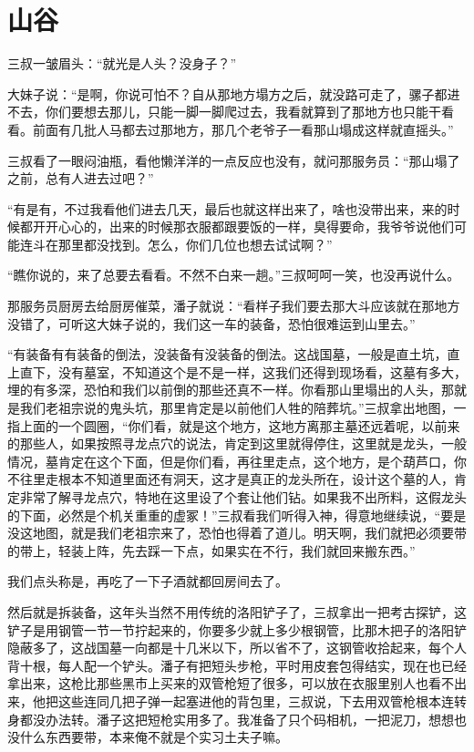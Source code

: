 \chapter{山谷}

三叔一皱眉头：“就光是人头？没身子？”

大妹子说：“是啊，你说可怕不？自从那地方塌方之后，就没路可走了，骡子都进不去，你们要想去那儿，只能一脚一脚爬过去，我看就算到了那地方也只能干看看。前面有几批人马都去过那地方，那几个老爷子一看那山塌成这样就直摇头。”

三叔看了一眼闷油瓶，看他懒洋洋的一点反应也没有，就问那服务员：“那山塌了之前，总有人进去过吧？”

“有是有，不过我看他们进去几天，最后也就这样出来了，啥也没带出来，来的时候都开开心心的，出来的时候那衣服都跟要饭的一样，臭得要命，我爷爷说他们可能连斗在那里都没找到。怎么，你们几位也想去试试啊？”

“瞧你说的，来了总要去看看。不然不白来一趟。”三叔呵呵一笑，也没再说什么。

那服务员厨房去给厨房催菜，潘子就说：“看样子我们要去那大斗应该就在那地方没错了，可听这大妹子说的，我们这一车的装备，恐怕很难运到山里去。”

“有装备有有装备的倒法，没装备有没装备的倒法。这战国墓，一般是直土坑，直上直下，没有墓室，不知道这个是不是一样，这我们还得到现场看，这墓有多大，埋的有多深，恐怕和我们以前倒的那些还真不一样。你看那山里塌出的人头，那就是我们老祖宗说的鬼头坑，那里肯定是以前他们人牲的陪葬坑。”三叔拿出地图，一指上面的一个圆圈，“你们看，就是这个地方，这地方离那主墓还远着呢，以前来的那些人，如果按照寻龙点穴的说法，肯定到这里就得停住，这里就是龙头，一般情况，墓肯定在这个下面，但是你们看，再往里走点，这个地方，是个葫芦口，你不往里走根本不知道里面还有洞天，这才是真正的龙头所在，设计这个墓的人，肯定非常了解寻龙点穴，特地在这里设了个套让他们钻。如果我不出所料，这假龙头的下面，必然是个机关重重的虚冢！”三叔看我们听得入神，得意地继续说，“要是没这地图，就是我们老祖宗来了，恐怕也得着了道儿。明天啊，我们就把必须要带的带上，轻装上阵，先去踩一下点，如果实在不行，我们就回来搬东西。”

我们点头称是，再吃了一下子酒就都回房间去了。

然后就是拆装备，这年头当然不用传统的洛阳铲子了，三叔拿出一把考古探铲，这铲子是用钢管一节一节拧起来的，你要多少就上多少根钢管，比那木把子的洛阳铲隐蔽多了，这战国墓一向都是十几米以下，所以省不了，这钢管收拾起来，每个人背十根，每人配一个铲头。潘子有把短头步枪，平时用皮套包得结实，现在也已经拿出来，这枪比那些黑市上买来的双管枪短了很多，可以放在衣服里别人也看不出来，他把这些连同几把子弹一起塞进他的背包里，三叔说，下去用双管枪根本连转身都没办法转。潘子这把短枪实用多了。我准备了只个码相机，一把泥刀，想想也没什么东西要带，本来俺不就是个实习土夫子嘛。

